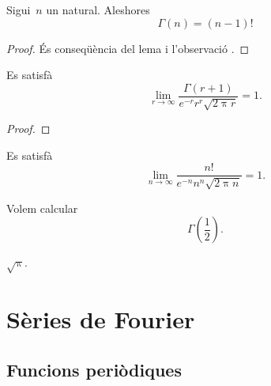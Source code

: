 \documentclass[../../main.tex]{subfiles}
\begin{document}
    \begin{lemma} %
        \label{lema:la-Gamma-dEuler-es-comporta-com-un-factorial}
        Sigui~\(n\) un natural.
        Aleshores
        \[
            \Gamma(n)=(n-1)!
        \]
    \end{lemma}
    \begin{proof}
        És conseqüència del lema  i l'observació .
    \end{proof}
    \begin{theorem}
        \label{thm:formula-dStirling}
        Es satisfà
        \[
            \lim_{r\to\infty}\frac{\Gamma(r+1)}{e^{-r}r^{r}\sqrt{2\uppi r}}=1.
        \]
    \end{theorem}
    \begin{proof}
    \end{proof}
    \begin{corollary}
        \label{cor:formula-dStirling}
        Es satisfà
        \[
            \lim_{n\to\infty}\frac{n!}{e^{-n}n^{n}\sqrt{2\uppi n}}=1.
        \]
    \end{corollary}
    \begin{example}
        Volem calcular
        \[
            \Gamma\left(\frac{1}{2}\right).
        \]
    \end{example}
    \begin{solution}
        \(\sqrt{\uppi}\).
    \end{solution}
\chapter{Sèries de Fourier}
\section{Funcions periòdiques}
\end{document}
